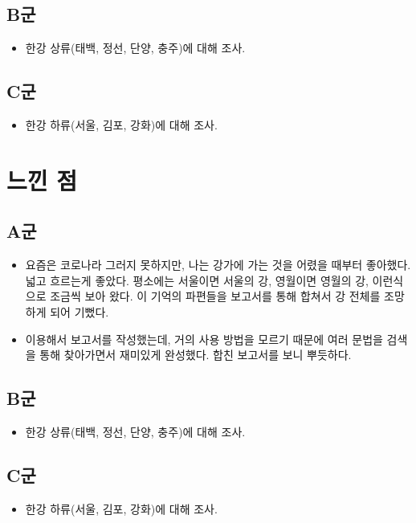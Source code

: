 \documentclass[chapter, oneside]{oblivoir}
\begin{document}
\subsection{B군}
\begin{itemize}
    \item 한강 상류(태백, 정선, 단양, 충주)에 대해 조사.
\end{itemize}
\subsection{C군}
\begin{itemize}
    \item 한강 하류(서울, 김포, 강화)에 대해 조사.
\end{itemize}


\section{느낀 점}
\subsection{A군}
\begin{itemize}
    \item 요즘은 코로나라 그러지 못하지만, 나는 강가에 가는 것을 어렸을 때부터 좋아했다. 넓고 흐르는게 좋았다. 평소에는 서울이면 서울의 강, 영월이면 영월의 강, 이런식으로 조금씩 보아 왔다. 이 기억의 파편들을 보고서를 통해 합쳐서 강 전체를 조망하게 되어 기뻤다.
    \item {} 이용해서 보고서를 작성했는데, 거의 사용 방법을 모르기 때문에 여러 문법을 검색을 통해 찾아가면서 재미있게 완성했다. 합친 보고서를 보니 뿌듯하다.
\end{itemize}
\subsection{B군}
\begin{itemize}
    \item 한강 상류(태백, 정선, 단양, 충주)에 대해 조사.
\end{itemize}
\subsection{C군}
\begin{itemize}
    \item 한강 하류(서울, 김포, 강화)에 대해 조사.
\end{itemize}
\end{document}
